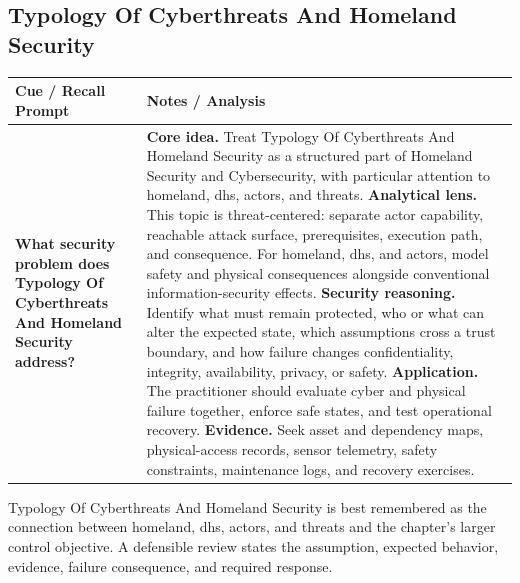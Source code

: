 \documentclass[11pt]{article}
\newcommand{\CornellHeader}{%
\rowcolor{Navy}\color{white}\bfseries Cue / Recall Prompt & \color{white}\bfseries Notes / Analysis\\\hline}
\newcommand{\CornellRow}[2]{%
\cellcolor{CueGray}\RaggedRight\textbf{#1} & \RaggedRight #2\\\hline}
\begin{document}
\subsection*{Typology Of Cyberthreats And Homeland Security}
\begin{longtable}{>{\RaggedRight\arraybackslash}p{}|>{\RaggedRight\arraybackslash}p{}}
\CornellHeader
\CornellRow{What security problem does Typology Of Cyberthreats And Homeland Security address?}{\textbf{Core idea.} Treat Typology Of Cyberthreats And Homeland Security as a structured part of Homeland Security and Cybersecurity, with particular attention to homeland, dhs, actors, and threats. \textbf{Analytical lens.} This topic is threat-centered: separate actor capability, reachable attack surface, prerequisites, execution path, and consequence. For homeland, dhs, and actors, model safety and physical consequences alongside conventional information-security effects. \textbf{Security reasoning.} Identify what must remain protected, who or what can alter the expected state, which assumptions cross a trust boundary, and how failure changes confidentiality, integrity, availability, privacy, or safety. \textbf{Application.} The practitioner should evaluate cyber and physical failure together, enforce safe states, and test operational recovery. \textbf{Evidence.} Seek asset and dependency maps, physical-access records, sensor telemetry, safety constraints, maintenance logs, and recovery exercises.}
\end{longtable}
\begin{topicsummary}
Typology Of Cyberthreats And Homeland Security is best remembered as the connection between homeland, dhs, actors, and threats and the chapter's larger control objective. A defensible review states the assumption, expected behavior, evidence, failure consequence, and required response.
\end{topicsummary}
\end{document}
